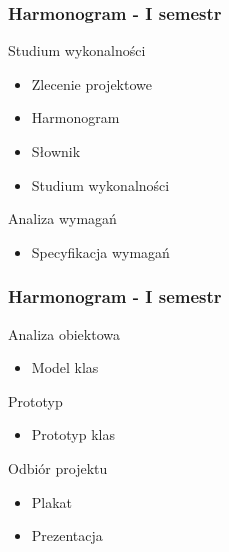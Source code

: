 \documentclass[xcolor=dvipsnames,9pt]{beamer}
\begin{document}
\begin{frame}
	\frametitle{Harmonogram - I semestr}
	\begin{block}{Studium wykonalności}	
	\begin{itemize}
 		\item  Zlecenie projektowe
		\item  Harmonogram
		\item Słownik
		\item Studium wykonalności
	\end{itemize}
	\end{block}
	\begin{block}{Analiza wymagań}
	\begin{itemize}
 		\item Specyfikacja wymagań
	\end{itemize}
	\end{block}
\end{frame}

\begin{frame}
	\frametitle{Harmonogram - I semestr}
	\begin{block}{Analiza obiektowa} 
	\begin{itemize}
 		\item Model klas
	\end{itemize}
	\end{block}
      \begin{block}{Prototyp} 
	\begin{itemize}
 		\item Prototyp klas
	
	\end{itemize}
	\end{block}
	\begin{block}{Odbiór projektu}
	\begin{itemize}
 		\item Plakat
		\item Prezentacja
	\end{itemize}
	\end{block}
\end{frame}
\end{document}
